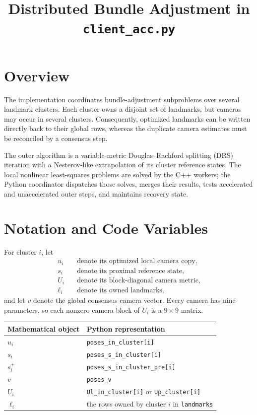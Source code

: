 \documentclass[11pt]{article}
\title{Distributed Bundle Adjustment in \texttt{client\_acc.py}}
\author{}
\date{}
\begin{document}
\maketitle

\section{Overview}

The implementation coordinates bundle-adjustment subproblems over several
landmark clusters.  Each cluster owns a disjoint set of landmarks, but cameras
may occur in several clusters.  Consequently, optimized landmarks can be
written directly back to their global rows, whereas the duplicate camera
estimates must be reconciled by a consensus step.

The outer algorithm is a variable-metric Douglas--Rachford splitting (DRS)
iteration with a Nesterov-like extrapolation of its cluster reference states.
The local nonlinear least-squares problems are solved by the C++ workers; the
Python coordinator dispatches those solves, merges their results, tests
accelerated and unaccelerated outer steps, and maintains recovery state.

\section{Notation and Code Variables}

For cluster $i$, let
\begin{align*}
u_i &\quad\text{denote its optimized local camera copy},\\
s_i &\quad\text{denote its proximal reference state},\\
U_i &\quad\text{denote its block-diagonal camera metric},\\
\ell_i &\quad\text{denote its owned landmarks},
\end{align*}
and let $v$ denote the global consensus camera vector.  Every camera has nine
parameters, so each nonzero camera block of $U_i$ is a $9\times9$ matrix.

\begin{center}
\begin{tabular}{ll}
\toprule
Mathematical object & Python representation \\
\midrule
$u_i$ & \verb|poses_in_cluster[i]| \\
$s_i$ & \verb|poses_s_in_cluster[i]| \\
$s_i^{+}$ & \verb|poses_s_in_cluster_pre[i]| \\
$v$ & \verb|poses_v| \\
$U_i$ & \verb|Ul_in_cluster[i]| or \verb|Up_cluster[i]| \\
$\ell_i$ & the rows owned by cluster $i$ in \verb|landmarks| \\
\bottomrule
\end{tabular}
\end{center}
\end{document}
